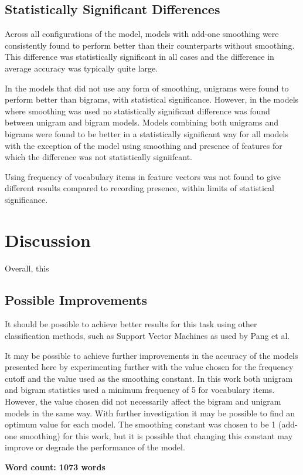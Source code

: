 \documentclass[twocolumn]{article}
\begin{document}
\subsection{Statistically Significant Differences}

Across all configurations of the model, models with add-one smoothing were consistently found to perform better than their counterparts without smoothing. This difference was statistically significant in all cases and the difference in average accuracy was typically quite large.

In the models that did not use any form of smoothing, unigrams were found to perform better than bigrams, with statistical significance. However, in the models where smoothing was used no statistically significant difference was found between unigram and bigram models. Models combining both unigrams and bigrams were found to be better in a statistically significant way for all models with the exception of the model using smoothing and presence of features for which the difference was not statistically signiifcant.

Using frequency of vocabulary items in feature vectors was not found to give different results compared to recording presence, within limits of statistical significance.

\section{Discussion}

Overall, this 

\subsection{Possible Improvements}

It should be possible to achieve better results for this task using other classification methods, such as Support Vector Machines as used by Pang et al. 

It may be possible to achieve further improvements in the accuracy of the models presented here by experimenting further with the value chosen for the frequency cutoff and the value used as the smoothing constant. In this work both unigram and bigram statistics used a minimum frequency of 5 for vocabulary items. However, the value chosen did not necessarily affect the bigram and unigram models in the same way. With further investigation it may be possible to find an optimum value for each model. The smoothing constant was chosen to be 1 (add-one smoothing) for this work, but it is possible that changing this constant may improve or degrade the performance of the model.





\textbf{Word count: 1073 words}

{}

\end{document}
